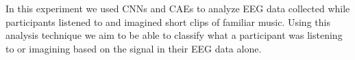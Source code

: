 In this experiment we used \acp{CNN} and \acp{CAE} to analyze EEG data collected while participants listened to and imagined short clips of familiar music. 
Using this analysis technique we aim to be able to classify what a participant was listening to or imagining based on the signal in their EEG data alone. 









